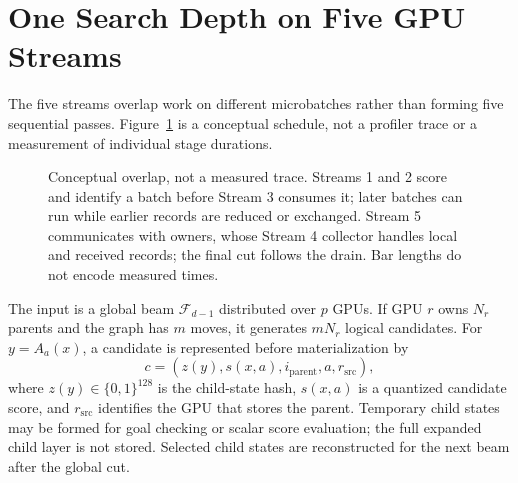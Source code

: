 \documentclass[10pt,twocolumn]{article}
\newcommand{\frontier}{\mathcal{F}}
\begin{document}
\section{One Search Depth on Five GPU Streams}
The five streams overlap work on different microbatches rather than forming
five sequential passes. Figure~\ref{fig:overlap} is a conceptual schedule,
not a profiler trace or a measurement of individual stage durations.

\begin{figure}[t]
\centering
{}
\caption{Conceptual overlap, not a measured trace. Streams 1 and 2 score
and identify a batch before Stream 3 consumes it; later batches can run while
earlier records are reduced or exchanged. Stream 5 communicates with owners,
whose Stream 4 collector handles local and received records; the final cut
follows the drain. Bar lengths do not encode measured times.}
\label{fig:overlap}
\end{figure}

The input is a global beam $\frontier_{d-1}$ distributed over $p$ GPUs.  If GPU
$r$ owns $N_r$ parents and the graph has $m$ moves, it generates $mN_r$
logical candidates.  For $y=A_a(x)$, a candidate is represented before
materialization by
\begin{equation}
 c=(z(y),s(x,a),i_{\mathrm{parent}},a,r_{\mathrm{src}}),
 \label{eq:candidate}
\end{equation}
where $z(y)\in\{0,1\}^{128}$ is the child-state hash, $s(x,a)$ is a
quantized candidate score, and $r_{\mathrm{src}}$ identifies the GPU that stores
 the parent. Temporary child states may be formed for goal checking or scalar
score evaluation; the full expanded child layer is not stored. Selected child
states are reconstructed for the next beam after the global cut.
\end{document}
